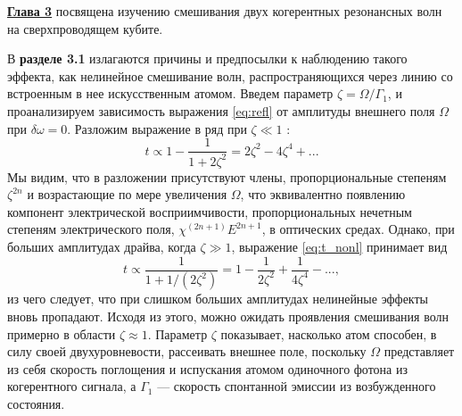 %

\underline{\textbf{Глава 3}} посвящена изучению смешивания двух когерентных резонансных волн на сверхпроводящем кубите. 

В \textbf{разделе 3.1} излагаются причины и предпосылки к наблюдению такого эффекта, как нелинейное смешивание волн, распространяющихся через линию со встроенным в нее искусственным атомом. Введем параметр $\zeta=\Omega/\Gamma_1$, и проанализируем зависимость выражения \eqref{eq:refl} от амплитуды внешнего поля $\Omega$ при $\delta\omega=0$.  Разложим выражение в ряд при $\zeta\ll1$ :
\begin{equation}
t \propto 1-\frac{1}{1+2\zeta^2} = 2\zeta^2 - 4\zeta^4 + ...
\label{eq:t_nonl}
\end{equation}
Мы видим, что в разложении присутствуют члены, пропорциональные степеням $\zeta^{2n}$ и возрастающие по мере увеличения $\Omega$, что эквивалентно появлению компонент электрической восприимчивости, пропорциональных нечетным степеням электрического поля, $\chi^{(2n+1)}E^{2n+1}$, в оптических средах. Однако, при больших амплитудах драйва, когда $\zeta\gg1$, выражение \eqref{eq:t_nonl}  принимает вид
\begin{equation}
t \propto \frac{1}{1+1/(2\zeta^{2})} = 1 - \frac{1}{2\zeta^2} + \frac{1}{4\zeta^4} - ... ,
\end{equation}
из чего следует, что при слишком больших амплитудах нелинейные эффекты вновь пропадают. Исходя из этого, можно ожидать проявления смешивания волн примерно в области $\zeta\approx1$.  Параметр $\zeta$ показывает, насколько атом способен, в силу своей двухуровневости, рассеивать внешнее поле, поскольку $\Omega$ представляет из себя скорость поглощения и испускания атомом одиночного фотона из когерентного сигнала, а $\Gamma_1$ --- скорость спонтанной эмиссии из возбужденного состояния. 

